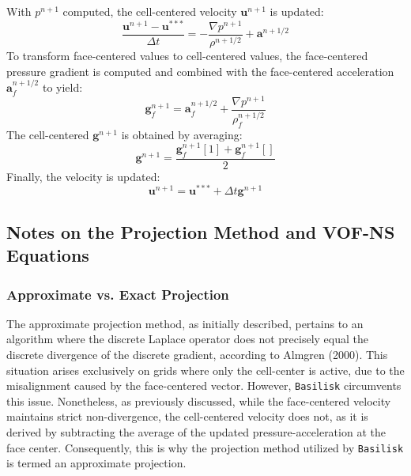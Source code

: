 With $p^{n+1}$ computed, the cell-centered velocity $\mathbf{u}^{n+1}$ is updated:  
\begin{equation}
    \frac{\mathbf{u}^{n+1} - \mathbf{u}^{***}}{\Delta t} = -\frac{\nabla
    p^{n+1}}{\rho^{n+1/2}} + \mathbf{a}^{n+1/2}
\end{equation}  
To transform face-centered values to cell-centered values, the face-centered pressure gradient is computed and combined with the face-centered acceleration $\mathbf{a}_f^{n+1/2}$ to yield:  
\begin{equation}
    \mathbf{g}_f^{n+1} = \mathbf{a}_f^{n+1/2} + \frac{\nabla p^{n+1}}{\rho_f^{n+1/2}}
\end{equation}  
The cell-centered $\mathbf{g}^{n+1}$ is obtained by averaging:  
\begin{equation}
    \mathbf{g}^{n+1} = \frac{\mathbf{g}_f^{n+1}[1] + \mathbf{g}_f^{n+1}[]}{2}
\end{equation}  
Finally, the velocity is updated:  
\begin{equation}
    \mathbf{u}^{n+1} = \mathbf{u}^{***} + \Delta t \mathbf{g}^{n+1}
\end{equation}  

\subsection{Notes on the Projection Method and VOF-NS Equations}
\subsubsection{Approximate vs. Exact Projection}  
The approximate projection method, as initially described, pertains to an algorithm where the discrete Laplace operator does not precisely equal the discrete divergence of the discrete gradient, according to Almgren (2000)\cite{2000_Almgren}. This situation arises exclusively on grids where only the cell-center is active, due to the misalignment caused by the face-centered vector. However, \texttt{Basilisk} circumvents this issue. Nonetheless, as previously discussed, while the face-centered velocity  maintains strict non-divergence, the cell-centered velocity  does not, as it is derived by subtracting the average of the updated pressure-acceleration at the face center. Consequently, this is why the projection method utilized by \texttt{Basilisk} is termed an approximate projection.

